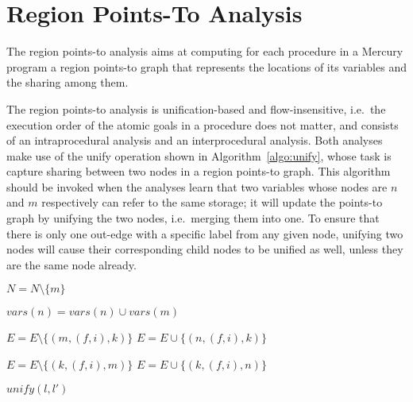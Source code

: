 \documentclass{tlp}
\newcommand{\vars}[1]{\ensuremath{\mathit{vars}(#1)}}
\begin{document}
\section{Region Points-To Analysis}
\label{seCrpta}

The region points-to analysis aims at computing
for each procedure in a Mercury program
a region points-to graph that represents
the locations of its variables and the sharing among them.

The region points-to analysis is unification-based and flow-insensitive,
i.e.\ the execution order of the atomic goals in a procedure does not matter,
and consists of an intraprocedural analysis and an interprocedural analysis.
Both analyses make use of the unify operation
shown in Algorithm~\ref{algo:unify},
whose task is capture sharing between two nodes in a region points-to graph.
This algorithm should be invoked when the analyses learn
that two variables whose nodes are $n$ and $m$ respectively
can refer to the same storage;
it will update the points-to graph by unifying the two nodes,
i.e.\ merging them into one.
To ensure that
there is only one out-edge with a specific label from any given node,
unifying two nodes will cause
their corresponding child nodes to be unified as well,
unless they are the same node already.

\begin{algorithm}
    \small
    \caption{$\mathit{unify}(n, m)$}
    \label{algo:unify}
\begin{algorithmic}

    \STATE $N = N \setminus \{m\}$

    \STATE $\vars{n} = \vars{n} \cup \vars{m}$

        \STATE $E = E \setminus \{(m,(f,i),k)\}$
            \STATE $E = E \cup \{(n,(f,i),k)\}$
        \ENDIF
    \ENDFOR

        \STATE $E = E \setminus \{(k,(f,i),m)\}$
            \STATE $E = E \cup \{(k,(f,i),n)\}$
        \ENDIF
    \ENDFOR

            \STATE $\mathit{unify}({l}, {l}')$
        \ENDIF
    \ENDFOR

\end{algorithmic}
\normalsize
\end{algorithm}
\end{document}
